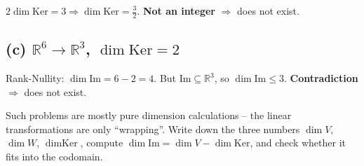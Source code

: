 \documentclass[a4paper,12pt]{article}
\begin{document}
$2 \dim \text{Ker} = 3 \Rightarrow \dim \text{Ker} = \tfrac{3}{2}$. \textbf{Not an integer} $\Rightarrow$ does not exist.

\subsection*{(c) $\mathbb{R}^6 \to \mathbb{R}^3$, $\dim \text{Ker} = 2$}

Rank-Nullity: $\dim \text{Im} = 6 - 2 = 4$. But $\text{Im} \subseteq \mathbb{R}^3$, so $\dim \text{Im} \leq 3$. \textbf{Contradiction} $\Rightarrow$ does not exist.

\begin{merkbox}[title={Recognize the pattern}]
Such problems are mostly pure dimension calculations -- the linear transformations are only ``wrapping''. Write down the three numbers $\dim V$, $\dim W$, $\dim \text{Ker}$, compute $\dim \text{Im} = \dim V - \dim \text{Ker}$, and check whether it fits into the codomain.
\end{merkbox}
\end{document}
